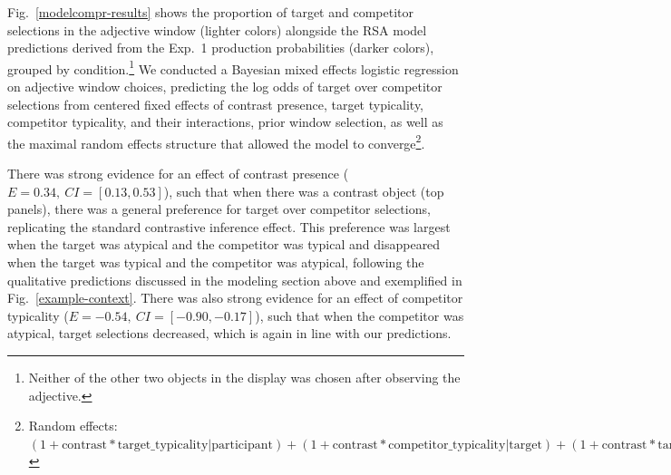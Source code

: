 \documentclass[10pt,letterpaper]{article}
\newcommand{\jd}[1]{\textcolor{Purple}{[jd: #1]}}
\newcommand{\figref}[1]{Fig.~\ref{#1}}
\begin{document}
\figref{modelcompr-results} shows the proportion of target and competitor selections in the adjective window (lighter colors) alongside the RSA model predictions derived from the Exp.~1 production probabilities (darker colors), grouped by condition.\footnote{Neither of the other two objects in the display was chosen after observing the adjective.} %
We conducted a Bayesian mixed effects logistic regression on adjective window choices, predicting the log odds of target over competitor selections from centered fixed effects of contrast presence, target typicality, competitor typicality, and their interactions, prior window selection, as well as the maximal random effects structure that allowed the model to converge\footnote{Random effects: $(1+\text{contrast}*\text{target\_typicality}|\text{participant}) + (1+\text{contrast}*\text{competitor\_typicality}|\text{target}) + (1+\text{contrast}*\text{target\_typicality}|\text{competitor})$}.

There was strong evidence for an effect of contrast presence ($E=0.34,\ CI=[0.13,0.53]$), such that when there was a contrast object (top panels), there was a general preference for target over competitor selections, replicating the standard contrastive inference effect. This preference was largest when the target was atypical and the competitor was typical and disappeared when the target was typical and the competitor was atypical, following the qualitative predictions discussed in the modeling section above and exemplified in \figref{example-context}. There was also strong evidence for an effect of competitor typicality ($E=-0.54,\ CI=[-0.90,-0.17]$), such that when the competitor was atypical, target selections decreased, which is again in line with our predictions.



\end{document}
